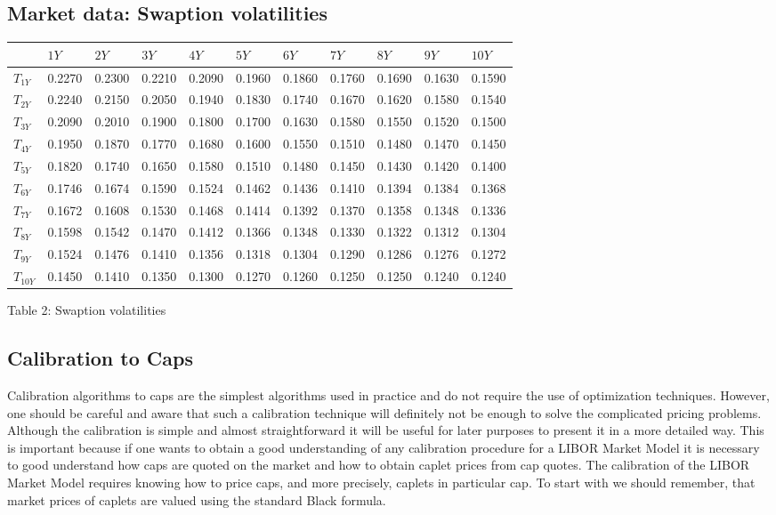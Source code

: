 \documentclass[11pt]{article}
\numberwithin{equation}{subsection}
\begin{document}
\subsection{Market data: Swaption volatilities}
\vskip 0.4cm 		
{
	\centering
	\begin{tabular}{|l|l|l|l|l|l|l|l|l|l|l|}
		\hline
		& \(1Y\) & \(2Y\) & \(3Y\) & \(4Y\) & \(5Y\) & \(6Y\) & \(7Y\) & \(8Y\) & \(9Y\) & \(10Y\) \\		
		\hline		
		\(T_{1Y}\) & 0.2270 & 0.2300 & 0.2210 & 0.2090 & 0.1960 & 0.1860 & 0.1760 & 0.1690 & 0.1630 & 0.1590 \\
		\(T_{2Y}\) & 0.2240 & 0.2150 & 0.2050 & 0.1940 & 0.1830 & 0.1740 & 0.1670 & 0.1620 & 0.1580 & 0.1540 \\
		\(T_{3Y}\) & 0.2090 & 0.2010 & 0.1900 & 0.1800 & 0.1700 & 0.1630 & 0.1580 & 0.1550 & 0.1520 & 0.1500 \\
		\(T_{4Y}\) & 0.1950 & 0.1870 & 0.1770 & 0.1680 & 0.1600 & 0.1550 & 0.1510 & 0.1480 & 0.1470 & 0.1450 \\
		\(T_{5Y}\) & 0.1820 & 0.1740 & 0.1650 & 0.1580 & 0.1510 & 0.1480 & 0.1450 & 0.1430 & 0.1420 & 0.1400 \\
		\(T_{6Y}\) & 0.1746 & 0.1674 & 0.1590 & 0.1524 & 0.1462 & 0.1436 & 0.1410 & 0.1394 & 0.1384 & 0.1368 \\
		\(T_{7Y}\) & 0.1672 & 0.1608 & 0.1530 & 0.1468 & 0.1414 & 0.1392 & 0.1370 & 0.1358 & 0.1348 & 0.1336 \\
		\(T_{8Y}\) & 0.1598 & 0.1542 & 0.1470 & 0.1412 & 0.1366 & 0.1348 & 0.1330 & 0.1322 & 0.1312 & 0.1304 \\
		\(T_{9Y}\) & 0.1524 & 0.1476 & 0.1410 & 0.1356 & 0.1318 & 0.1304 & 0.1290 & 0.1286 & 0.1276 & 0.1272 \\
		\(T_{10Y}\)& 0.1450 & 0.1410 & 0.1350 & 0.1300 & 0.1270 & 0.1260 & 0.1250 & 0.1250 & 0.1240 & 0.1240 \\	
		\hline				 				
	\end{tabular}
	\begin{center}
	Table 2: Swaption volatilities
	\end{center}
}
\vskip 0.4cm

\subsection{Calibration to Caps}
Calibration algorithms to caps are the simplest algorithms used in practice and do not
require the use of optimization techniques. However, one should be careful and aware that
such a calibration technique will definitely not be enough to solve the complicated pricing
problems. Although the calibration is simple and almost straightforward it will be useful for
later purposes to present it in a more detailed way. This is important because if one wants to
obtain a good understanding of any calibration procedure for a LIBOR Market Model it is
necessary to good understand how caps are quoted on the market and how to obtain caplet
prices from cap quotes.
The calibration of the LIBOR Market Model requires knowing how to price caps, and
more precisely, caplets in particular cap. To start with we should remember, that market
prices of caplets are valued using the standard Black formula.
\end{document}
